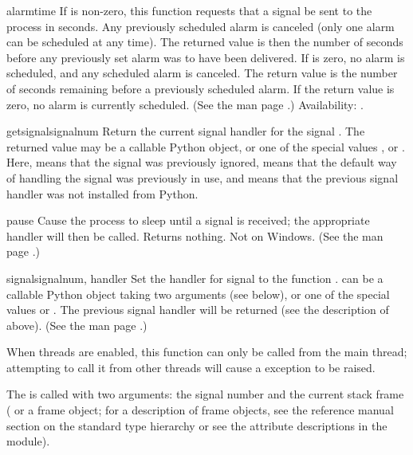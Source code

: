 \begin{funcdesc}{alarm}{time}
  If  is non-zero, this function requests that a
   signal be sent to the process in  seconds.
  Any previously scheduled alarm is canceled (only one alarm can
  be scheduled at any time).  The returned value is then the number of
  seconds before any previously set alarm was to have been delivered.
  If  is zero, no alarm is scheduled, and any scheduled
  alarm is canceled.  The return value is the number of seconds
  remaining before a previously scheduled alarm.  If the return value
  is zero, no alarm is currently scheduled.  (See the \UNIX{} man page
  .)
  Availability: \UNIX.
\end{funcdesc}

\begin{funcdesc}{getsignal}{signalnum}
  Return the current signal handler for the signal .
  The returned value may be a callable Python object, or one of the
  special values ,  or
  .  Here,  means that the
  signal was previously ignored,  means that the
  default way of handling the signal was previously in use, and
   means that the previous signal handler was not installed
  from Python.
\end{funcdesc}

\begin{funcdesc}{pause}{}
  Cause the process to sleep until a signal is received; the
  appropriate handler will then be called.  Returns nothing.  Not on
  Windows. (See the \UNIX{} man page .)
\end{funcdesc}

\begin{funcdesc}{signal}{signalnum, handler}
  Set the handler for signal  to the function
  .   can be a callable Python object
  taking two arguments (see below), or
  one of the special values  or
  .  The previous signal handler will be returned
  (see the description of  above).  (See the
  \UNIX{} man page .)

  When threads are enabled, this function can only be called from the
  main thread; attempting to call it from other threads will cause a
   exception to be raised.

  The  is called with two arguments: the signal number
  and the current stack frame ( or a frame object;
  for a description of frame objects, see the reference manual section
  on the standard type hierarchy or see the attribute descriptions in
  the  module).
\end{funcdesc}

